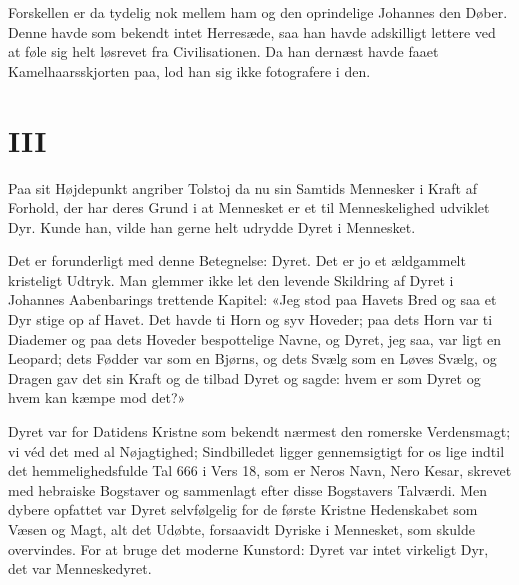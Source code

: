 \documentclass[12pt,a4paper]{article}
\begin{document}
Forskellen er da tydelig nok mellem ham og den oprindelige Johannes den
Døber. Denne havde som bekendt intet Herresæde, saa han havde adskilligt
lettere ved at føle sig helt løsrevet fra Civilisationen. Da han dernæst
havde faaet Kamelhaarsskjorten paa, lod han sig ikke fotografere i den.

\section*{III}

Paa sit Højdepunkt angriber Tolstoj da nu sin Samtids Mennesker i Kraft
af Forhold, der har deres Grund i at Mennesket er et til Menneskelighed
udviklet Dyr. Kunde han, vilde han gerne helt udrydde Dyret i Mennesket.

Det er forunderligt med denne Betegnelse: Dyret. Det er jo et ældgammelt
kristeligt Udtryk. Man glemmer ikke let den levende Skildring af Dyret i
Johannes Aabenbarings trettende Kapitel: «Jeg stod paa Havets Bred og saa
et Dyr stige op af Havet. Det havde ti Horn og syv Hoveder; paa dets Horn
var ti Diademer og paa dets Hoveder bespottelige Navne, og Dyret, jeg
saa, var ligt en Leopard; dets Fødder var som en Bjørns, og dets Svælg
som en Løves Svælg, og Dragen gav det sin Kraft og de tilbad Dyret og
sagde: hvem er som Dyret og hvem kan kæmpe mod det?»

Dyret var for Datidens Kristne som bekendt nærmest den romerske
Verdensmagt; vi véd det med al Nøjagtighed; Sindbilledet ligger
gennemsigtigt for os lige indtil det hemmelighedsfulde Tal 666 i Vers 18,
som er Neros Navn, Nero Kesar, skrevet med hebraiske Bogstaver og
sammenlagt efter disse Bogstavers Talværdi. Men dybere opfattet var Dyret
selvfølgelig for de første Kristne Hedenskabet som Væsen og Magt, alt det
Udøbte, forsaavidt Dyriske i Mennesket, som skulde overvindes. For at
bruge det moderne Kunstord: Dyret var intet virkeligt Dyr, det var
Menneskedyret.
\end{document}
